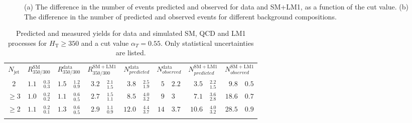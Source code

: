 \begin{figure}[!t]
  \begin{center} 
    \caption{\label{fig:diff_vs_at_method3} (a) The difference in the
      number of events predicted and observed for data and SM+LM1, as
      a function of the \aT cut value. (b) The difference in the
      number of predicted and observed events for different background
      compositions.}
  \end{center}
\end{figure}

\medskip
\begin{table}[!h]
 \begin{center}
   \caption{\label{tab:total_prediction_method3} Predicted and measured yields
     for data and simulated SM, QCD and LM1 processes for $H_{\mathrm{T}} \geq 350$
     and a cut value $\alpha_{T} = 0.55$. Only statistical uncertainties
     are listed.}
  \begin{tabular}{cr@{$\ \pm\ $}lr@{$\ \pm\ $}lr@{$\ \pm\ $}lr@{$\ \pm\ $}lr@{$\ \pm\ $}lr@{$\ \pm\ $}lr@{$\ \pm\ $}l}
   \hline\noalign{\smallskip}
   $N_{\mathrm{jet}}$ & 
   \multicolumn{2}{c}{$R^{\mathrm{SM}}_{350/300}$} &
   \multicolumn{2}{c}{$R^{\mathrm{data}}_{350/300}$} &
   \multicolumn{2}{c}{$R^{\mathrm{SM+LM1}}_{350/300}$} &
   \multicolumn{2}{c}{$N^{\mathrm{data}}_{predicted}$} &
   \multicolumn{2}{c}{$N^{\mathrm{data}}_{observed}$} &
   \multicolumn{2}{c}{$N^{\mathrm{SM+LM1}}_{predicted}$} &
   \multicolumn{2}{c}{$N^{\mathrm{SM+LM1}}_{observed}$} \\
   \noalign{\smallskip}\hline\noalign{\smallskip}
   2 & 
   $1.1$&$^{0.3}_{0.3}$ & 
   $1.5$&$^{1.2}_{0.9}$ &
   $3.2$&$^{2.1}_{1.5}$ & 
   $3.8$&$^{2.5}_{1.9}$ & 
   $5$&$2.2$ &
   $3.5$&$^{2.2}_{1.5}$ & 
   $9.8$&$0.5$ \\
   $\geq$3 & 
   $1.0$&$^{0.2}_{0.2}$ &
   $1.1$&$^{0.6}_{0.5}$ & 
   $2.7$&$^{1.5}_{1.1}$ &
   $8.5$&$^{4.0}_{3.2}$ & 
   $9$&$3$ &
   $7.1$&$^{3.6}_{2.8}$ & 
   $18.6$&$0.7$ \\
   $\geq$2 &
   $1.1$&$^{0.2}_{0.1}$ &
   $1.3$&$^{0.6}_{0.5}$ & 
   $2.9$&$^{1.1}_{0.9}$ &
   $12.0$&$^{4.4}_{3.7}$ & 
   $14$&$3.7$ &
   $10.6$&$^{4.0}_{3.2}$ &
   $28.5$&$0.9$ \\
   \noalign{\smallskip}\hline
  \end{tabular}
 \end{center}
\end{table}

